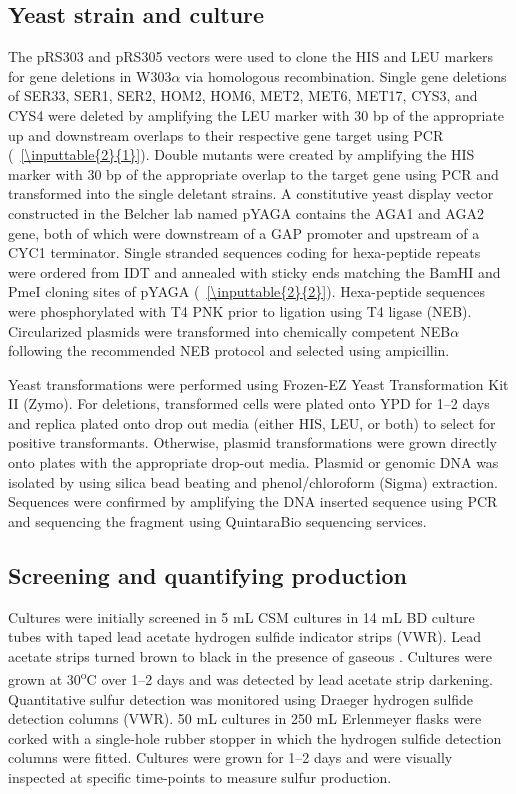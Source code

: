 \documentclass[../main/main]{subfiles}
\begin{document}
\subsection*{Yeast strain and culture}
The pRS303 and pRS305 vectors were used to clone the HIS and LEU markers for gene deletions in W303$\alpha$ via homologous recombination. Single gene deletions of SER33, SER1, SER2, HOM2, HOM6, MET2, MET6, MET17, CYS3, and CYS4 were deleted by amplifying the LEU marker with 30 bp of the appropriate up and downstream overlaps to their respective gene target using PCR (\sTABLE~\ref{\inputtable{2}{1}}). Double mutants were created by amplifying the HIS marker with 30 bp of the appropriate overlap to the target gene using PCR and transformed into the single deletant strains. A constitutive yeast display vector constructed in the Belcher lab named pYAGA contains the AGA1 and AGA2 gene, both of which were downstream of a GAP promoter and upstream of a CYC1 terminator. Single stranded sequences coding for hexa-peptide repeats were ordered from IDT and annealed with sticky ends matching the BamHI and PmeI cloning sites of pYAGA (\sTABLE~\ref{\inputtable{2}{2}}). Hexa-peptide sequences were phosphorylated with T4 PNK prior to ligation using T4 ligase (NEB). Circularized plasmids were transformed into chemically competent NEB$\alpha$ following the recommended NEB protocol and selected using ampicillin.

Yeast transformations were performed using Frozen-EZ Yeast Transformation Kit II (Zymo). For deletions, transformed cells were plated onto YPD for 1--2 days and replica plated onto drop out media (either HIS, LEU, or both) to select for positive transformants. Otherwise, plasmid transformations were grown directly onto plates with the appropriate drop-out media. Plasmid or genomic DNA was isolated by using silica bead beating and phenol/chloroform (Sigma) extraction. Sequences were confirmed by amplifying the DNA inserted sequence using PCR and sequencing the fragment using QuintaraBio sequencing services.

\subsection*{Screening and quantifying \HS{} production}
Cultures were initially screened in 5 mL CSM cultures in 14 mL BD culture tubes with taped lead acetate hydrogen sulfide indicator strips (VWR). Lead acetate strips turned brown to black in the presence of gaseous \HS{}. Cultures were grown at 30\textsuperscript{o}C over 1--2 days and \HS{} was detected by lead acetate strip darkening. Quantitative sulfur detection was monitored using Draeger hydrogen sulfide detection columns (VWR). 50 mL cultures in 250 mL Erlenmeyer flasks were corked with a single-hole rubber stopper in which the hydrogen sulfide detection columns were fitted. Cultures were grown for 1--2 days and were visually inspected at specific time-points to measure sulfur production.
\end{document}
